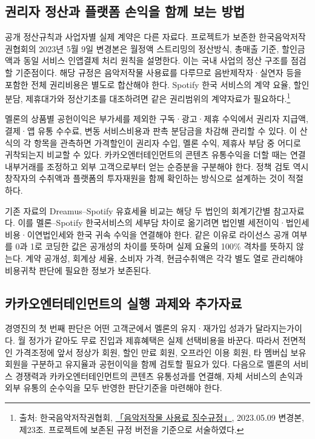 \documentclass[11pt,a4paper]{report}
\newcommand{\sourcefootnote}[1]{\footnote{출처: #1}}
\begin{document}
\subsection{권리자 정산과 플랫폼 손익을 함께 보는 방법}

공개 정산규칙과 사업자별 실제 계약은 다른 자료다. 프로젝트가 보존한 한국음악저작권협회의 2023년 5월 9일 변경본은 월정액 스트리밍의 정산방식, 총매출 기준, 할인금액과 동일 서비스 인앱결제 처리 원칙을 설명한다. 이는 국내 사업의 정산 구조를 점검할 기준점이다. 해당 규정은 음악저작물 사용료를 다루므로 음반제작자·실연자 등을 포함한 전체 권리비용은 별도로 합산해야 한다. Spotify 한국 서비스의 계약 요율, 할인 분담, 제휴대가와 정산기초를 대조하려면 같은 권리범위의 계약자료가 필요하다.\sourcefootnote{한국음악저작권협회, \href{https://www.copyright.or.kr/master/file/displayPdf.do?fileNo=39520}{「음악저작물 사용료 징수규정」}, 2023.05.09 변경본, 제23조. 프로젝트에 보존된 규정 버전을 기준으로 서술하였다.}

멜론의 상품별 공헌이익은 부가세를 제외한 구독·광고·제휴 수익에서 권리자 지급액, 결제·앱 유통 수수료, 변동 서비스비용과 판촉 분담금을 차감해 관리할 수 있다. 이 산식의 각 항목을 관측하면 가격할인이 권리자 수입, 멜론 수익, 제휴사 부담 중 어디로 귀착되는지 비교할 수 있다. 카카오엔터테인먼트의 콘텐츠 유통수익을 더할 때는 연결 내부거래를 조정하고 외부 고객으로부터 얻는 순증분을 구분해야 한다. 정책 검토 역시 창작자의 수취액과 플랫폼의 투자재원을 함께 확인하는 방식으로 설계하는 것이 적절하다.

기존 자료의 Dreamus--Spotify 유효세율 비교는 해당 두 법인의 회계기간별 참고자료다. 이를 멜론--Spotify 한국서비스의 세부담 차이로 옮기려면 법인별 세전이익·법인세비용·이연법인세와 한국 귀속 수익을 연결해야 한다. 같은 이유로 라이선스 공개 여부를 0과 1로 코딩한 값은 공개성의 차이를 뜻하며 실제 요율의 100\% 격차를 뜻하지 않는다. 계약 공개성, 회계상 세율, 소비자 가격, 현금수취액은 각각 별도 열로 관리해야 비용귀착 판단에 필요한 정보가 보존된다.

\subsection{카카오엔터테인먼트의 실행 과제와 추가자료}

경영진의 첫 번째 판단은 어떤 고객군에서 멜론의 유지·재가입 성과가 달라지는가이다. 월 정가가 같아도 무료 진입과 제휴혜택은 실제 선택비용을 바꾼다. 따라서 전면적인 가격조정에 앞서 정상가 회원, 할인 만료 회원, 오프라인 이용 회원, 타 멤버십 보유 회원을 구분하고 유지율과 공헌이익을 함께 검토할 필요가 있다. 다음으로 멜론의 서비스 경쟁력과 카카오엔터테인먼트의 콘텐츠 유통성과를 연결해, 자체 서비스의 손익과 외부 유통의 순수익을 모두 반영한 판단기준을 마련해야 한다.
\end{document}
